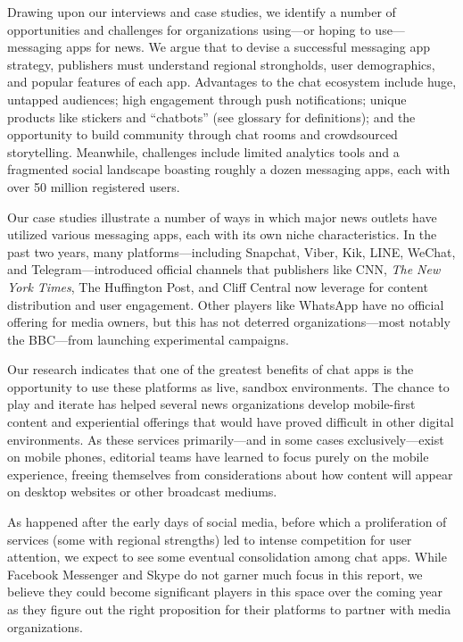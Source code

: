 \documentclass[notoc, symmetric, nobib, nols]{towcenter-guideto-book}
\begin{document}
Drawing upon our interviews and case studies, we identify a number of opportunities and challenges for organizations using---or hoping to use---messaging apps for news. We argue that to devise a successful messaging app strategy, publishers must understand regional strongholds, user demographics, and popular features of each app. Advantages to the chat ecosystem include huge, untapped audiences; high engagement through push notifications; unique products like stickers and ``chatbots'' (see glossary for definitions); and the opportunity to build community through chat rooms and crowdsourced storytelling. Meanwhile, challenges include limited analytics tools and a fragmented social landscape boasting roughly a dozen messaging apps, each with over 50 million registered users.

Our case studies illustrate a number of ways in which major news outlets have utilized various messaging apps, each with its own niche characteristics. In the past two years, many platforms---including Snapchat, Viber, Kik, LINE, WeChat, and Telegram---introduced official channels that publishers like CNN, \textit{The New York Times}, The Huffington Post, and Cliff Central now leverage for content distribution and user engagement. Other players like WhatsApp have no official offering for media owners, but this has not deterred organizations---most notably the BBC---from launching experimental campaigns.

Our research indicates that one of the greatest benefits of chat apps is the opportunity to use these platforms as live, sandbox environments. The chance to play and iterate has helped several news organizations develop mobile-first content and experiential offerings that would have proved difficult in other digital environments. As these services primarily---and in some cases exclusively---exist on mobile phones, editorial teams have learned to focus purely on the mobile experience, freeing themselves from considerations about how content will appear on desktop websites or other broadcast mediums.

As happened after the early days of social media, before which a proliferation of services (some with regional strengths) led to intense competition for user attention, we expect to see some eventual consolidation among chat apps. While Facebook Messenger and Skype do not garner much focus in this report, we believe they could become significant players in this space over the coming year as they figure out the right proposition for their platforms to partner with media organizations.
\end{document}
